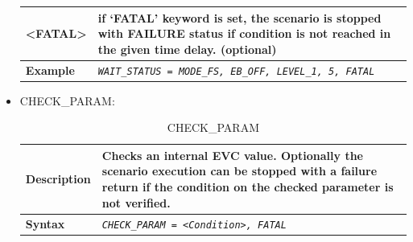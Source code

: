 \documentclass{template/openetcs}
\begin{document}
\begin{itemize}
\begin{longtable}{|l|l|l|}
			\hline
	
				
				\begin{minipage}[t]{0.22\linewidth} \textbf{<FATAL>} \end{minipage}
			&	\multicolumn{2}{l|}{	\begin{minipage}[t]{0.78\linewidth}	if ‘FATAL’ keyword is set, the scenario is stopped with FAILURE status if condition is not reached in the given time delay. (optional)	\end{minipage} } \\ 
	
			\hline
	
				
				\begin{minipage}[t]{0.22\linewidth} \textbf{Example} \end{minipage}
			&	\multicolumn{2}{l|}{ \begin{minipage}[t]{0.78\linewidth} \emph{\texttt{WAIT\_STATUS = MODE\_FS, EB\_OFF, LEVEL\_1, 5, FATAL}} \end{minipage} } \\ 
	
			\hline\hline

		\end{longtable}
		
	\item CHECK\_PARAM:
				
		\begin{longtable}{|l|l|l|}
			\caption{CHECK\_PARAM}\\ 
			\hline
			
				\begin{minipage}[t]{0.22\linewidth} \textbf{Description} \end{minipage} 
			&	\multicolumn{2}{l|}{ \begin{minipage}[t]{0.78\linewidth} Checks an internal EVC value. Optionally the scenario execution can be stopped with a failure return if the condition on the checked parameter is not verified. \end{minipage} } \\
															
			\hline
							
				\begin{minipage}[t]{0.22\linewidth} \textbf{Syntax}	\end{minipage}
			&	\multicolumn{2}{l|}{ \begin{minipage}[t]{0.78\linewidth} \emph{\texttt{CHECK\_PARAM = <Condition>, FATAL}} \end{minipage} } \\
			

\end{longtable}
\end{itemize}
\end{document}
